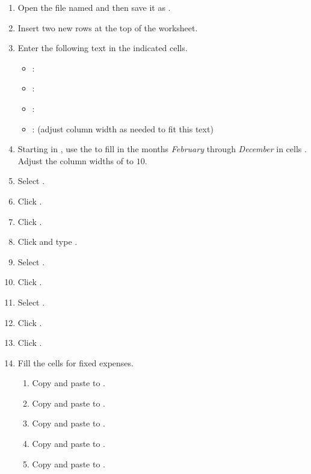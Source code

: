 \begin{enumerate}
	\item Open the file named  and then save it as .
	\item Insert two new rows at the top of the worksheet.
	\item Enter the following text in the indicated cells.

\begin{itemize}
	\item {}: 
	\item {}: 
	\item {}: 
	\item {}:  (adjust column width as needed to fit this text)
\end{itemize}

	\item Starting in , use the  to fill in the months \textit{February} through \textit{December} in cells . Adjust the column widths of  to $ 10 $.
	\item Select .
	\item Click .
	\item Click . 
	\item Click  and type . 
	\item Select .
	\item Click .
	\item Select .
	\item Click .
	\item Click . 

	\item Fill the cells for fixed expenses.
	\begin{enumerate}
		\item Copy  and paste to .
		\item Copy  and paste to .
		\item Copy  and paste to .
		\item Copy  and paste to .
		\item Copy  and paste to .
	\end{enumerate}	
	

\end{enumerate}
